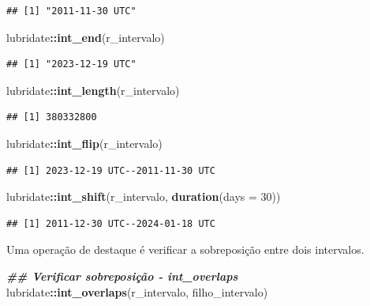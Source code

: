 \documentclass[
]{article}
\newenvironment{Shaded}{\begin{snugshade}}{\end{snugshade}}
\newcommand{\AttributeTok}[1]{\textcolor[rgb]{0.13,0.29,0.53}{#1}}
\newcommand{\DecValTok}[1]{\textcolor[rgb]{0.00,0.00,0.81}{#1}}
\newcommand{\DocumentationTok}[1]{\textcolor[rgb]{0.56,0.35,0.01}{\textbf{\textit{#1}}}}
\newcommand{\FunctionTok}[1]{\textcolor[rgb]{0.13,0.29,0.53}{\textbf{#1}}}
\newcommand{\NormalTok}[1]{#1}
\newcommand{\SpecialCharTok}[1]{\textcolor[rgb]{0.81,0.36,0.00}{\textbf{#1}}}
\begin{document}
\begin{verbatim}
## [1] "2011-11-30 UTC"
\end{verbatim}

\begin{Shaded}
\begin{Highlighting}[]
\NormalTok{lubridate}\SpecialCharTok{::}\FunctionTok{int\_end}\NormalTok{(r\_intervalo)}
\end{Highlighting}
\end{Shaded}

\begin{verbatim}
## [1] "2023-12-19 UTC"
\end{verbatim}

\begin{Shaded}
\begin{Highlighting}[]
\NormalTok{lubridate}\SpecialCharTok{::}\FunctionTok{int\_length}\NormalTok{(r\_intervalo)}
\end{Highlighting}
\end{Shaded}

\begin{verbatim}
## [1] 380332800
\end{verbatim}

\begin{Shaded}
\begin{Highlighting}[]
\NormalTok{lubridate}\SpecialCharTok{::}\FunctionTok{int\_flip}\NormalTok{(r\_intervalo)}
\end{Highlighting}
\end{Shaded}

\begin{verbatim}
## [1] 2023-12-19 UTC--2011-11-30 UTC
\end{verbatim}

\begin{Shaded}
\begin{Highlighting}[]
\NormalTok{lubridate}\SpecialCharTok{::}\FunctionTok{int\_shift}\NormalTok{(r\_intervalo, }\FunctionTok{duration}\NormalTok{(}\AttributeTok{days =} \DecValTok{30}\NormalTok{))}
\end{Highlighting}
\end{Shaded}

\begin{verbatim}
## [1] 2011-12-30 UTC--2024-01-18 UTC
\end{verbatim}

Uma operação de destaque é verificar a sobreposição entre dois intervalos.

\begin{Shaded}
\begin{Highlighting}[]
\DocumentationTok{\#\# Verificar sobreposição {-} int\_overlaps}
\NormalTok{lubridate}\SpecialCharTok{::}\FunctionTok{int\_overlaps}\NormalTok{(r\_intervalo, filho\_intervalo)}
\end{Highlighting}
\end{Shaded}
\end{document}
